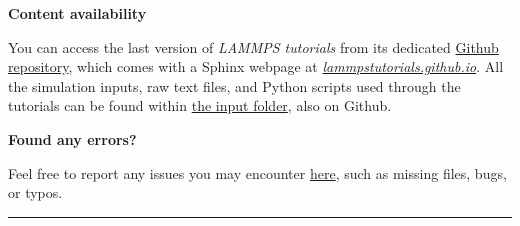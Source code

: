 \thispagestyle{empty}
\setcounter{page}{0}



\vspace{1.5cm}


\noindent \textbf{\large Content availability}

\vspace{0.5cm}

\noindent You can access the last version of \emph{LAMMPS tutorials}
from its dedicated \href{https://github.com/lammpstutorials/lammpstutorials.github.io}{Github repository},
which comes with a Sphinx webpage at \href{https://lammpstutorials.github.io/}{\emph{lammpstutorials.github.io}}.
All the simulation inputs, raw text files, and Python scripts used through
the tutorials can be found within \href{https://github.com/lammpstutorials/lammpstutorials.github.io/tree/version2.0/docs/inputs}{the input folder}, also on Github.

\vspace{0.5cm}

\noindent \textbf{\large Found any errors?}

\vspace{0.5cm}

\noindent Feel free to report any issues you may
encounter \href{https://github.com/lammpstutorials/lammpstutorials.github.io/issues}{here},
such as missing files, bugs, or typos.

\vspace*{\fill}

\par\noindent\rule{\textwidth}{0.5pt}

\doclicenseThis

